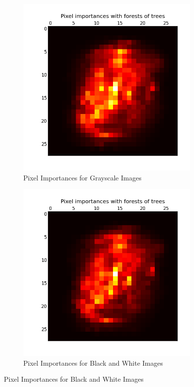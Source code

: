 \documentclass[12pt]{article}
\begin{document}
\begin{figure}[H]
\centering
\begin{subfigure}{.4\textwidth}
  \centering
  \includegraphics[width=1\linewidth]{gray_importances.png}
  \caption{Pixel Importances for Grayscale Images}
  \label{fig:sub1}
\end{subfigure}%
\hspace{4mm}
\begin{subfigure}{.4\textwidth}
  \centering
  \includegraphics[width=1\linewidth]{bw_importances.png}
  \caption{Pixel Importances for Black and White Images}
  \label{fig:sub2}
\end{subfigure}
\end{figure}
\end{document}
